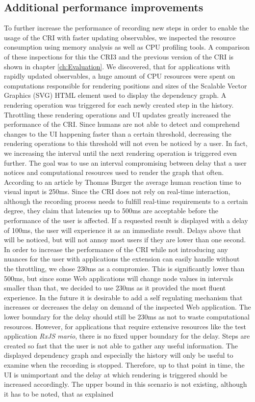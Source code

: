 \subsection{Additional performance improvements}
\label{sec:additonPerformance}
To further increase the performance of recording new steps in order to enable the usage of the CRI with faster updating observables, we inspected the resource consumption using memory analysis as well as CPU profiling tools. A comparison of these inspections for this the CRI3 and the previous version of the CRI is shown in chapter \ref{ch:Evaluation}. We discovered, that for applications with rapidly updated observables, a huge amount of CPU resources were spent on computations responsible for rendering positions and sizes of the Scalable Vector Graphics (SVG) HTML element used to display the dependency graph. A rendering operation was triggered for each newly created step in the history. Throttling these rendering operations and UI updates greatly increased the performance of the CRI. Since humans are not able to detect and comprehend changes to the UI happening faster than a certain threshold, decreasing the rendering operations to this threshold will not even be noticed by a user. In fact, we increasing the interval until the next rendering operation is triggered even further. The goal was to use an interval compromising between delay that a user notices and computational resources used to render the graph that often. According to an article by Thomas Burger \cite{Perception} the average human reaction time to visual input is 250ms. Since the CRI does not rely on real-time interaction, although the recording process needs to fulfill real-time requirements to a certain degree, they claim that latencies up to 500ms are acceptable before the performance of the user is affected. If a requested result is displayed with a delay of 100ms, the user will experience it as an immediate result. Delays above that will be noticed, but will not annoy most users if they are lower than one second. In order to increase the performance of the CRI while not introducing any nuances for the user with applications the extension can easily handle without the throttling, we chose 230ms as a compromise. This is significantly lower than 500ms, but since some Web applications will change node values in intervals smaller than that, we decided to use 230ms as it provided the most fluent experience. In the future it is desirable to add a self regulating mechanism that increases or decreases the delay on demand of the inspected Web application. The lower boundary for the delay should still be 230ms as not to waste computational resources. However, for applications that require extensive resources like the test application \emph{RxJS mario}, there is no fixed upper boundary for the delay. Steps are created so fast that the user is not able to gather any useful information. The displayed dependency graph and especially the history will only be useful to examine when the recording is stopped. Therefore, up to that point in time, the UI is unimportant and the delay at which rendering is triggered should be increased accordingly. The upper bound in this scenario is not existing, although it has to be noted, that as explained 